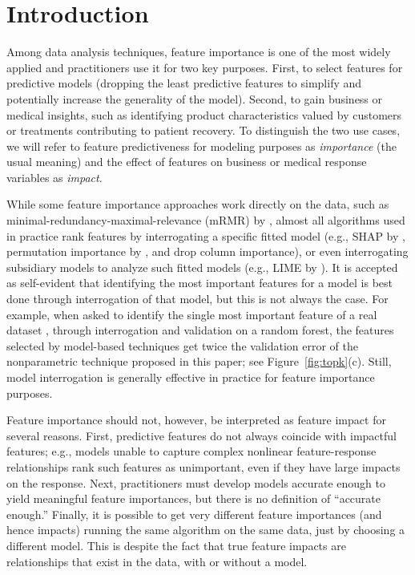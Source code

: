 \documentclass[11pt]{article}
\newcommand{\figref}[1]{Figure~\ref{#1}}
\newcommand{\todo}[1]{{{\small\color{red}{[#1]}}}}
\begin{document}
\section{Introduction}
\label{sec:intro}

\todo{
integrating gradients for loss functions and neural networks

strobl  tree specific permutation importance

talk about gini drop and how it is biased; random var.

Hooker's fix to gini drop

add how we tuned RF, other models. What is $R^2$?
}

Among data analysis techniques, feature importance is one of the most widely applied and practitioners use it for two key purposes. First, to select features for predictive models (dropping the least predictive features to simplify and potentially increase the generality of the model). Second, to gain business or medical insights, such as identifying product characteristics valued by customers or treatments contributing to patient recovery.  To distinguish the two use cases, we will refer to feature predictiveness for modeling purposes as {\em importance} (the usual meaning) and the effect of features on business or medical response variables as {\em impact}.

While some feature importance approaches work directly on the data, such as minimal-redundancy-maximal-relevance (mRMR) by \cite{mRMR}, almost all algorithms used in practice rank features by interrogating a specific fitted model (e.g., SHAP by \citealt{shap}, permutation importance by \citealt{RF}, and drop column importance), or even interrogating subsidiary models to analyze such fitted models (e.g., LIME by \citealt{lime}). It is accepted as self-evident that identifying the most important features for a model is best done through interrogation of that  model, but this is not always the case.  For example, when asked to identify the single most important feature of a real dataset \citep{bulldozer}, through interrogation and validation on a random forest, the features selected by model-based techniques get twice the validation error of the nonparametric technique proposed in this paper; see \figref{fig:topk}(c). Still, model interrogation is generally effective in practice for feature importance purposes.

Feature importance should not, however, be interpreted as feature impact for several reasons. First, predictive features do not always coincide with impactful features; e.g., models unable to capture complex nonlinear feature-response relationships rank such features as unimportant, even if they have large impacts on the response. Next, practitioners must develop models accurate enough to yield meaningful feature importances, but there is no definition of ``accurate enough.'' Finally, it is possible to get very different feature importances (and hence impacts) running the same algorithm on the same data, just by choosing a different model. This is despite the fact that true feature impacts are relationships that exist in the data, with or without a model.
\end{document}
